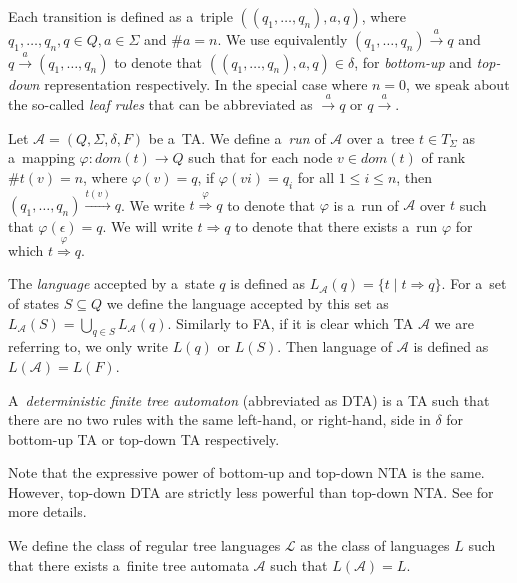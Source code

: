 Each transition is defined as a~triple $((q_1,\ldots,q_n), a, q)$, where
$q_1,\ldots,q_n,q \in Q, a \in \Sigma$ and $\#a = n$. We use equivalently
$(q_1,\ldots,q_n) \overset{a}{\longrightarrow} q$ and $q
\overset{a}{\longrightarrow}  (q_1,\ldots,q_n)$ to denote that
$((q_1,\ldots,q_n), a, q) \in \delta$, for \emph{bottom-up} and \emph{top-down}
representation respectively. In the special case where $n = 0$, we speak about
the so-called \emph{leaf rules} that can be abbreviated as
$\overset{a}{\longrightarrow}  q$ or $q \overset{a}{\longrightarrow} $.

Let $\mathcal{A} = (Q, \Sigma, \delta, F)$ be a~TA. We define a~\emph{run} of
$\mathcal{A}$ over a~tree $t \in T_\Sigma$ as a~mapping $\varphi: dom(t) \to Q$
such that for each node $v \in dom(t)$ of rank $\#t(v) = n$, where $\varphi(v) =
q$, if $\varphi(vi) = q_i$ for all $1 \leq i \leq n$, then $(q_1,\ldots,q_n)
\overset{t(v)}{\longrightarrow} q$. We write $t
\overset{\varphi}{\Longrightarrow} q$ to denote that $\varphi$ is a~run of
$\mathcal{A}$ over $t$ such that $\varphi(\epsilon) = q$. We will write $t
\Longrightarrow q$ to denote that there exists a~run $\varphi$ for which $t
\overset{\varphi}{\Longrightarrow} q$.

The \emph{language} accepted by a~state $q$ is defined as $L_{\mathcal{A}}(q) =
\{t \mid t \Rightarrow q\}$. For a~set of states $S \subseteq Q$ we define the
language accepted by this set as $L_{\mathcal{A}}(S) = \bigcup_{q \in S}
L_{\mathcal{A}}(q)$. Similarly to FA, if it is clear which TA $\mathcal{A}$ we
are referring to, we only write $L(q)$ or $L(S)$. Then language of $\mathcal{A}$
is defined as $L(\mathcal{A}) = L(F)$.

\begin{defz}
A~\emph{deterministic finite tree automaton} (abbreviated as DTA) is a
TA such that there are no two rules with the
same left-hand, or right-hand, side in $\delta$ for bottom-up TA or top-down
TA respectively.
\end{defz}

Note that the expressive power of bottom-up and top-down NTA is the same.
However, top-down DTA are strictly less powerful than top-down NTA. See
\cite{tata} for more details.

\begin{defz}
We define the class of regular tree languages $\mathcal{L}$ as the class of
languages $L$ such that there exists a~finite tree automata $\mathcal{A}$ such that
$L(\mathcal{A}) = L$.
\end{defz}

